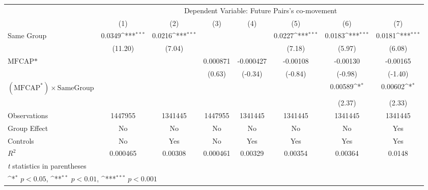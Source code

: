 {
\def\sym#1{\ifmmode^{#1}\else\(^{#1}\)\fi}
\begin{tabular}{l*{7}{c}}
\hline\hline
                &\multicolumn{7}{c}{Dependent Variable: Future Pairs's co-movement}                                                                  \\\cmidrule(lr){2-8}
                &\multicolumn{1}{c}{(1)}         &\multicolumn{1}{c}{(2)}         &\multicolumn{1}{c}{(3)}         &\multicolumn{1}{c}{(4)}         &\multicolumn{1}{c}{(5)}         &\multicolumn{1}{c}{(6)}         &\multicolumn{1}{c}{(7)}         \\
\hline
Same Group      &   0.0349\sym{***}&   0.0216\sym{***}&                  &                  &   0.0227\sym{***}&   0.0183\sym{***}&   0.0181\sym{***}\\
                &  (11.20)         &   (7.04)         &                  &                  &   (7.18)         &   (5.97)         &   (6.08)         \\
[1em]
$ \text{MFCAP*} $&                  &                  & 0.000871         &-0.000427         & -0.00108         & -0.00130         & -0.00165         \\
                &                  &                  &   (0.63)         &  (-0.34)         &  (-0.84)         &  (-0.98)         &  (-1.40)         \\
[1em]
 $ (\text{MFCAP}^*) \times {\text{SameGroup} }  $ &                  &                  &                  &                  &                  &  0.00589\sym{*}  &  0.00602\sym{*}  \\
                &                  &                  &                  &                  &                  &   (2.37)         &   (2.33)         \\
\hline
Observations    &  1447955         &  1341445         &  1447955         &  1341445         &  1341445         &  1341445         &  1341445         \\
Group Effect    &       No         &       No         &       No         &       No         &       No         &       No         &      Yes         \\
Controls        &       No         &      Yes         &       No         &      Yes         &      Yes         &      Yes         &      Yes         \\
$ R^2 $         & 0.000465         &  0.00308         & 0.000461         &  0.00329         &  0.00354         &  0.00364         &   0.0148         \\
\hline\hline
\multicolumn{8}{l}{\footnotesize \textit{t} statistics in parentheses}\\
\multicolumn{8}{l}{\footnotesize \sym{*} \(p<0.05\), \sym{**} \(p<0.01\), \sym{***} \(p<0.001\)}\\
\end{tabular}
}
